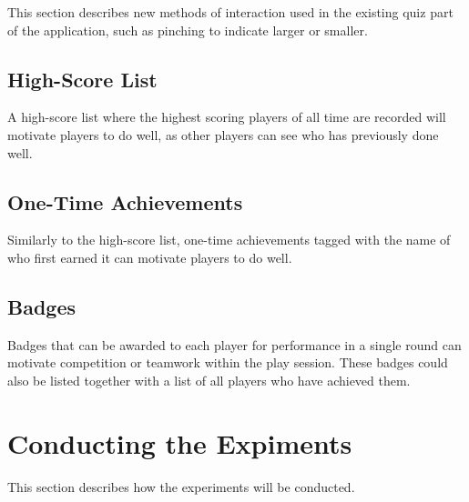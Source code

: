 This section describes new methods of interaction used in the existing quiz part of the application, such as pinching to indicate larger or smaller.


\subsection{High-Score List}

A high-score list where the highest scoring players of all time are recorded will motivate players to do well, as other players can see who has previously done well.


\subsection{One-Time Achievements}

Similarly to the high-score list, one-time achievements tagged with the name of who first earned it can motivate players to do well.


\subsection{Badges}

Badges that can be awarded to each player for performance in a single round can motivate competition or teamwork within the play session. These badges could also be listed together with a list of all players who have achieved them.


\section{Conducting the Expiments}

This section describes how the experiments will be conducted.